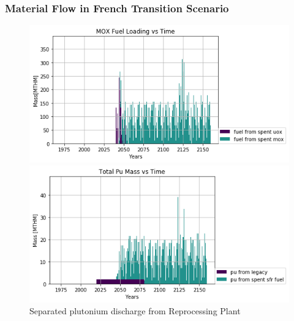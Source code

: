 \begin{frame}
	\frametitle{Material Flow in French Transition Scenario}
	
\begin{figure}[htbp!]
\begin{minipage}[b]{.45\linewidth}
	\begin{center}
		\includegraphics[width=\textwidth]{./images/french-transition/where_fuel.png}
	\end{center}
	\caption{Timeseries of fuel loaded into \glspl{SFR}}
	\label{fig:fuel}
\end{minipage}
\hspace{.5cm}
\begin{minipage}[b]{.45\linewidth}
	\centering
		\includegraphics[width=\linewidth]{./images/french-transition/pu.png}
	\caption{Separated plutonium discharge from Reprocessing Plant}
	\label{fig:pu_no_cum}
\end{minipage}
\end{figure}

\end{frame}